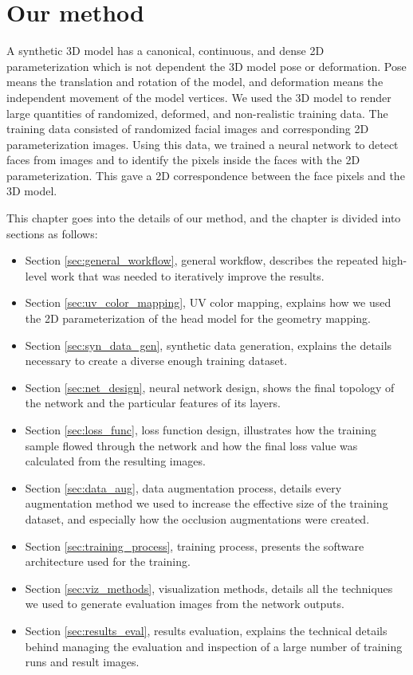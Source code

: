 \chapter{Our method}

A synthetic 3D model has a canonical, continuous, and dense 2D parameterization which is not dependent the 3D model pose or deformation. Pose means the translation and rotation of the model, and deformation means the independent movement of the model vertices. We used the 3D model to render large quantities of randomized, deformed, and non-realistic training data. The training data consisted of randomized facial images and corresponding 2D parameterization images. Using this data, we trained a neural network to detect faces from images and to identify the pixels inside the faces with the 2D parameterization. This gave a 2D correspondence between the face pixels and the 3D model.

This chapter goes into the details of our method, and the chapter is divided into sections as follows:

\begin{itemize}
    \item Section \ref{sec:general_workflow}, general workflow, describes the repeated high-level work that was needed to iteratively improve the results.
    \item Section \ref{sec:uv_color_mapping}, UV color mapping, explains how we used the 2D parameterization of the head model for the geometry mapping.
    \item Section \ref{sec:syn_data_gen}, synthetic data generation, explains the details necessary to create a diverse enough training dataset.
    \item Section \ref{sec:net_design}, neural network design, shows the final topology of the network and the particular features of its layers.
    \item Section \ref{sec:loss_func}, loss function design, illustrates how the training sample flowed through the network and how the final loss value was calculated from the resulting images.
    \item Section \ref{sec:data_aug}, data augmentation process, details every augmentation method we used to increase the effective size of the training dataset, and especially how the occlusion augmentations were created.
    \item Section \ref{sec:training_process}, training process, presents the software architecture used for the training.
    \item Section \ref{sec:viz_methods}, visualization methods, details all the techniques we used to generate evaluation images from the network outputs.
    \item Section \ref{sec:results_eval}, results evaluation, explains the technical details behind managing the evaluation and inspection of a large number of training runs and result images.
\end{itemize}

